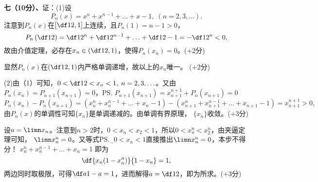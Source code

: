 \bs
{\bf 七（10分）、}证：(1)\;设
  $$P_n(x)=x^n+x^{n-1}+\ldots+x-1,\;(n=2,3,\ldots).$$
  注意到$P_n(x)$在$\left[\df12,1\right]$上连续，且$P_n(1)=n-1>0$，
  $$P_n\left(\df12\right)=\df1{2^n}+\df1{2^{n-1}}+\ldots+\df12-1
  =-\df1{2^n}<0,$$
  故由介值定理，必存在$x_n\in\left(\df12,1\right)$，使得$P_n(x_n)=0$。\hfill{{(+2分)}}
  
  显然$P_n(x)$在$\left(\df12,1\right)$内严格单调递增，故以上的$x_n$唯一。
  \hfill{{(+2分)}}

(2)\;由（1）可知，$0<\df12<x_n<1,\;n=2,3,\ldots$。又由$P_n(x_n)=
  P_{n+1}(x_{n+1})=0$，\ps{$P_{n+1}(x_{n+1})=x_{n+1}^{n+1}+P_n(x_{n+1})=0$}
  $$P_n(x_n)-P_n(x_{n+1})=(x_n^n+x_n^{n-1}+\ldots+x_n-1)
  -(x_{n+1}^n+x_{n+1}^{n-1}+\ldots+x_{n+1}-1)=x_{n+1}^{n+1}>0,$$
  由$P_n(x)$的单调性可知$\{x_n\}$是单调递减的。由单调有界原理，
  $\{x_n\}$收敛。\hfill{{(+3分)}}
  
  设$a=\limn x_n$。注意到$n>2$时，$0<x_n<x_2<1$，所以$0<x_n^n<x_2^n$，由夹逼定理可知，
  $\limn x_n^n=0$。又等式\ps{\b 由$0<x_n<1$直接推出$\limn x_n^n=0$，本步不得分！}
  $x_n^n+x_n^{n-1}+\ldots+x_n=1$
  即为
  $$\df{x_n(1-x_n^n)}{1-x_n}=1,$$
  两边同时取极限，可得$\df a{1-a}=1$，进而解得$a=\df12$，即为所求。\hfill{{(+3分)}}